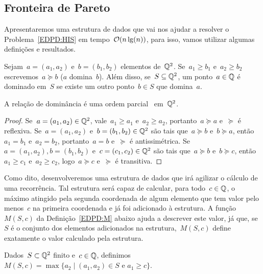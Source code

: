 
\subsection{Fronteira de Pareto}

Apresentaremos uma estrutura de dados que vai nos ajudar a resolver o Problema~\ref{EDPD:HIS} em tempo~$\mathcal{O}(n\lg(n))$, para isso, vamos utilizar algumas definições e resultados.

\begin{defi}
Sejam~${ a = (a_1,a_2) }$ e~${ b = (b_1,b_2) }$ elementos de~$\mathbb{Q}^2$. Se~${ a_1 \geq b_1 }$ e~${ a_2 \geq b_2 }$ escrevemos~${ a \succeq b }$ ($a$ domina~$b$). Além disso, se~${ S \subseteq \mathbb{Q}^2 }$, um ponto~${ a \in \mathbb{Q} }$ é dominado em~$S$ se existe um outro ponto~$b \in S$ que domina~$a$.
\end{defi}

\begin{prop}
A relação de dominância é uma ordem parcial~\cite[Apêndice B]{CLRS} em~$\mathbb{Q}^2$.
\end{prop}
\begin{proof}
Se~$a = (a_1,a_2) \in \mathbb{Q}^2$, vale~$a_1 \geq a_1$ e~$a_2 \geq a_2$, portanto~$a \succeq a$ e~$\succeq$ é reflexiva. Se~$a = (a_1,a_2)$ e~$b = (b_1,b_2) \in \mathbb{Q}^2$ são tais que~$a \succeq b$ e~$b \succeq a$, então~$a_1 = b_1$ e~$a_2 = b_2$, portanto~$a = b$ e~$\succeq$ é antissimétrica. Se~$a = (a_1,a_2), b = (b_1,b_2)$ e~$c = (c_1,c_2) \in \mathbb{Q}^2$ são tais que~$a \succeq b$ e~$b \succeq c$, então~$a_1 \geq c_1$ e~$a_2 \geq c_2$, logo~$a \succeq c$ e~$\succeq$ é transitiva.
\end{proof}

Como dito, desenvolveremos uma estrutura de dados que irá agilizar o cálculo de uma recorrência. Tal estrutura será capaz de calcular, para todo~${ c \in \mathbb{Q} }$, o máximo atingido pela segunda coordenada de algum elemento que tem valor pelo menos~$c$ na primeira coordenada e já foi adicionado à estrutura. A função~$M(S,c)$ da Definição~\ref{EDPD:M} abaixo ajuda a descrever este valor, já que, se~$S$ é o conjunto dos elementos adicionados na estrutura,~$M(S,c)$ define exatamente o valor calculado pela estrutura.
\begin{defi} \label{EDPD:M}
Dados~$S \subset \mathbb{Q}^2$ finito e~$c \in \mathbb{Q}$, definimos~${M(S,c) = \max\{a_2 \mid (a_1,a_2) \in S \text{ e } a_1 \geq c\}}$.
\end{defi}


